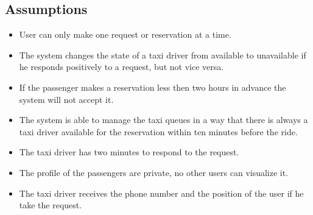 \documentclass[18pt,oneside,a4paper, titlepage]{article}
\begin{document}
		\subsection{Assumptions}
			\begin{itemize}
				\item User can only make one request or reservation at a time.
				\item The system changes the state of a taxi driver from available to unavailable if he responds positively to a request, but not vice versa.
				\item If the passenger makes a reservation less then two hours in advance the system will not accept it.
				\item The system is able to manage the taxi queues in a way that there is always a taxi driver available for the reservation within ten minutes before the ride.
				\item The taxi driver has two minutes to respond to the request.
				\item The profile of the passengers are private, no other users can visualize it.
				\item The taxi driver receives the phone number and the position of the user if he take the request.
			\end{itemize}
			
\end{document}
